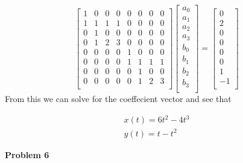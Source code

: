 \documentclass[a4paper,12pt]{article}
\begin{document}
\begin{equation*}
 \begin{bmatrix}
	1 & 0 & 0 & 0 & 0 & 0 & 0 & 0           \\[0.2em]
	1 & 1 & 1 & 1 & 0 & 0 & 0 & 0           \\[0.2em]
	0 & 1 & 0 & 0 & 0 & 0 & 0 & 0           \\[0.2em]
	0 & 1 & 2 & 3 & 0 & 0 & 0 & 0           \\[0.2em]
	0 & 0 & 0 & 0 & 1 & 0 & 0 & 0           \\[0.2em]
	0 & 0 & 0 & 0 & 1 & 1 & 1 & 1           \\[0.2em]
	0 & 0 & 0 & 0 & 0 & 1 & 0 & 0           \\[0.2em]
	0 & 0 & 0 & 0 & 0 & 1 & 2 & 3           \\[0.2em]
     \end{bmatrix}
 \begin{bmatrix}
	a_0           \\[0.2em]
	a_1          \\[0.2em]
	a_2          \\[0.2em]
	a_3           \\[0.2em]
	b_0           \\[0.2em]
	b_1          \\[0.2em]
	b_2          \\[0.2em]
	b_3           \\[0.2em]
     \end{bmatrix}
=
 \begin{bmatrix}
	0           \\[0.2em]
	2          \\[0.2em]
	0          \\[0.2em]
	0           \\[0.2em]
	0           \\[0.2em]
	0          \\[0.2em]
	1          \\[0.2em]
	-1           \\[0.2em]
     \end{bmatrix}
\end{equation*}
From this we can solve for the coeffecient vector and see that 

\begin{eqnarray*}
x(t)=6t^2-4t^3 \\
y(t)=t-t^2
\end{eqnarray*}

{\bf Problem 6}
\smallskip
\end{document}
